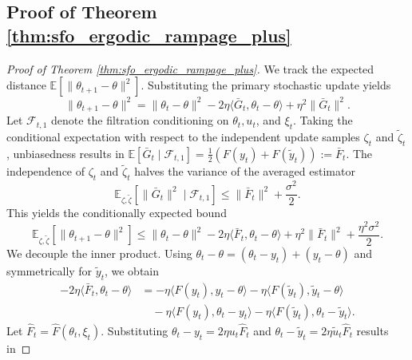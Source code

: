 \documentclass[letter,11pt]{article}
\begin{document}
\subsection{Proof of Theorem \ref{thm:sfo_ergodic_rampage_plus}}\label{sec:sfo_ergodic_rampage_plus}
\begin{proof}[Proof of Theorem \ref{thm:sfo_ergodic_rampage_plus}]
We track the expected distance $\mathbb{E}[\|\theta_{t+1} - \theta\|^2]$. Substituting the primary stochastic update yields
\begin{equation}
\|\theta_{t+1} - \theta\|^2 = \|\theta_t - \theta\|^2 - 2\eta \langle \bar{G}_t, \theta_t - \theta \rangle + \eta^2 \|\bar{G}_t\|^2.
\end{equation}
Let $\mathcal{F}_{t, 1}$ denote the filtration conditioning on $\theta_t, u_t$, and $\xi_t$. Taking the conditional expectation with respect to the independent update samples $\zeta_t$ and $\tilde{\zeta}_t$, unbiasedness results in $\mathbb{E}[\bar{G}_t \mid \mathcal{F}_{t, 1}] = \frac{1}{2}(F(y_t) + F(\tilde{y}_t)) := \bar{F}_t$. The independence of $\zeta_t$ and $\tilde{\zeta}_t$ halves the variance of the averaged estimator
\begin{equation}
\mathbb{E}_{\zeta, \tilde{\zeta}}\left[\|\bar{G}_t\|^2 \mid \mathcal{F}_{t, 1}\right] \le \|\bar{F}_t\|^2 + \frac{\sigma^2}{2}.
\end{equation}
This yields the conditionally expected bound
\begin{equation} \label{eq:sfo_ramp_base_distance}
\mathbb{E}_{\zeta, \tilde{\zeta}}\left[\|\theta_{t+1} - \theta\|^2\right] \le \|\theta_t - \theta\|^2 - 2\eta \langle \bar{F}_t, \theta_t - \theta \rangle + \eta^2 \|\bar{F}_t\|^2 + \frac{\eta^2 \sigma^2}{2}.
\end{equation}
We decouple the inner product. Using $\theta_t - \theta = (\theta_t - y_t) + (y_t - \theta)$ and symmetrically for $\tilde{y}_t$, we obtain
\begin{equation}
\begin{aligned}
-2\eta \langle \bar{F}_t, \theta_t - \theta \rangle &= -\eta \langle F(y_t), y_t - \theta \rangle - \eta \langle F(\tilde{y}_t), \tilde{y}_t - \theta \rangle \\
&\quad - \eta \langle F(y_t), \theta_t - y_t \rangle - \eta \langle F(\tilde{y}_t), \theta_t - \tilde{y}_t \rangle.
\end{aligned}
\end{equation}
Let $\hat{F}_t = \hat{F}(\theta_t, \xi_t)$. Substituting $\theta_t - y_t = 2\eta u_t \hat{F}_t$ and $\theta_t - \tilde{y}_t = 2\eta \tilde{u}_t \hat{F}_t$ results in

\end{proof}
\end{document}
